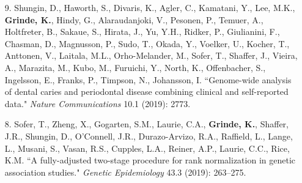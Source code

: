 \documentclass[margin]{res}
\begin{document}
\begin{resume}
\begin{itemize}
\item[9.] Shungin, D., Haworth, S., Divaris, K., Agler, C., Kamatani, Y., Lee, M.K., \textbf{Grinde, K.}, Hindy, G., Alaraudanjoki, V., Pesonen, P., Temuer, A., Holtfreter, B., Sakaue, S., Hirata, J., Yu, Y.H., Ridker, P., Giulianini, F., Chasman, D., Magnusson, P., Sudo, T., Okada, Y., Voelker, U., Kocher, T., Anttonen, V., Laitala, M.L., Orho-Melander, M., Sofer, T., Shaffer, J., Vieira, A., Marazita, M., Kubo, M., Furuichi, Y., North, K., Offenbacher, S., Ingelsson, E., Franks, P., Timpson, N., Johansson, I. ``Genome-wide analysis of dental caries and periodontal disease combining clinical and self-reported data." \textit{Nature Communications} 10.1 (2019): 2773.

\item[8.] Sofer, T., Zheng, X., Gogarten, S.M., Laurie, C.A., \textbf{Grinde, K.}, Shaffer, J.R., Shungin, D., O'Connell, J.R., Durazo-Arvizo, R.A., Raffield, L., Lange, L., Musani, S., Vasan, R.S., Cupples, L.A., Reiner, A.P., Laurie, C.C., Rice, K.M. ``A fully-adjusted two-stage procedure for rank normalization in genetic association studies." \textit{Genetic Epidemiology} 43.3 (2019): 263--275.


\end{itemize}
\end{resume}
\end{document}
